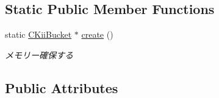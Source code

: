 \subsection*{Static Public Member Functions}
\begin{DoxyCompactItemize}
\item 
static \hyperlink{class_c_kii_bucket}{C\-Kii\-Bucket} $\ast$ \hyperlink{class_c_kii_bucket_a282979b68d7540433bfb24a4624702de}{create} ()
\begin{DoxyCompactList}\small\item\em メモリー確保する \end{DoxyCompactList}\end{DoxyCompactItemize}
\subsection*{Public Attributes}
